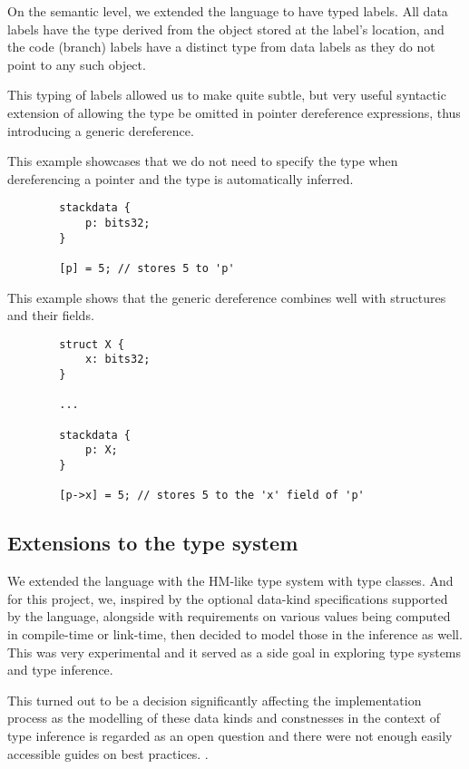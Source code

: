 On the semantic level, we extended the language to have typed labels. All data labels have the type derived from the object stored at the label's location, and the code (branch) labels have a distinct type from data labels as they do not point to any such object.

This typing of labels allowed us to make quite subtle, but very useful syntactic extension of allowing the type be omitted in pointer dereference expressions, thus introducing a generic dereference.

\begin{ex}
    This example showcases that we do not need to specify the type when dereferencing a pointer and the type is automatically inferred.

    \begin{lstlisting}
        stackdata {
            p: bits32;
        }

        [p] = 5; // stores 5 to 'p'
    \end{lstlisting}
\end{ex}

\begin{ex}
    This example shows that the generic dereference combines well with structures and their fields.

    \begin{lstlisting}
        struct X {
            x: bits32;
        }

        ...

        stackdata {
            p: X;
        }

        [p->x] = 5; // stores 5 to the 'x' field of 'p'
    \end{lstlisting}
\end{ex}

\subsection{Extensions to the type system}

We extended the language with the HM-like type system with type classes. And for this project, we, inspired by the optional data-kind specifications supported by the \cmm language, alongside with requirements on various values being computed in compile-time or link-time, then decided to model those in the inference as well. This was very experimental and it served as a side goal in exploring type systems and type inference.

This turned out to be a decision significantly affecting the implementation process as the modelling of these data kinds and constnesses in the context of type inference is regarded as an open question and there were not enough easily accessible guides on best practices. .

